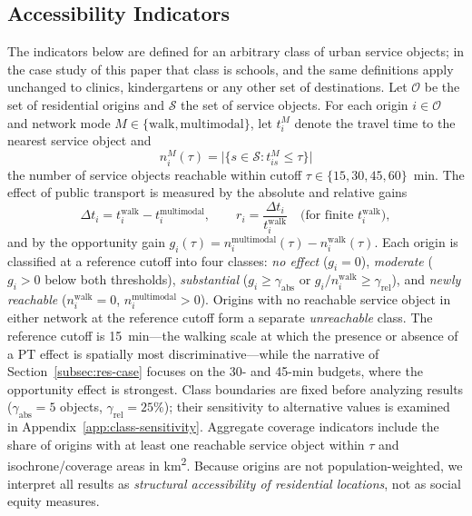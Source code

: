\documentclass[smartcities,article,submit,moreauthors]{Definitions/mdpi}
\begin{document}
    \subsection{Accessibility Indicators}
    \label{subsec:indicators}

    The indicators below are defined for an arbitrary class of urban service objects; in the case study
    of this paper that class is schools, and the same definitions apply unchanged to clinics,
    kindergartens or any other set of destinations.
    Let $\mathcal{O}$ be the set of residential origins and $\mathcal{S}$ the set of service objects.
    For each origin $i \in \mathcal{O}$ and network mode
    $M \in \{\mathrm{walk}, \mathrm{multimodal}\}$, let $t_i^{M}$ denote the travel time to the nearest
    service object and
    \begin{equation}
        n_i^{M}(\tau) = \bigl|\{ s \in \mathcal{S} : t_{is}^{M} \le \tau \}\bigr|
    \end{equation}
    the number of service objects reachable within cutoff $\tau \in \{15, 30, 45, 60\}$~min.
    The effect of public transport is measured by the absolute and relative gains
    \begin{equation}
        \Delta t_i = t_i^{\mathrm{walk}} - t_i^{\mathrm{multimodal}},
        \qquad
        r_i = \frac{\Delta t_i}{t_i^{\mathrm{walk}}} \quad \text{(for finite } t_i^{\mathrm{walk}}\text{)},
    \end{equation}
    and by the opportunity gain
    $g_i(\tau) = n_i^{\mathrm{multimodal}}(\tau) - n_i^{\mathrm{walk}}(\tau)$.
    Each origin is classified at a reference cutoff into four classes: \emph{no effect} ($g_i = 0$),
    \emph{moderate} ($g_i > 0$ below both thresholds), \emph{substantial}
    ($g_i \ge \gamma_{\mathrm{abs}}$ or $g_i / n_i^{\mathrm{walk}} \ge \gamma_{\mathrm{rel}}$), and
    \emph{newly reachable} ($n_i^{\mathrm{walk}} = 0$, $n_i^{\mathrm{multimodal}} > 0$).
    Origins with no reachable service object in either network at the reference cutoff form a separate
    \emph{unreachable} class.
    The reference cutoff is 15~min---the walking scale at which the presence or absence of a PT effect
    is spatially most discriminative---while the narrative of Section~\ref{subsec:res-case} focuses on
    the 30- and 45-min budgets, where the opportunity effect is strongest.
    Class boundaries are fixed before analyzing results ($\gamma_{\mathrm{abs}} = 5$ objects,
    $\gamma_{\mathrm{rel}} = 25\%$); their sensitivity to alternative values is examined in
    Appendix~\ref{app:class-sensitivity}.
    Aggregate coverage indicators include the share of origins with at least one reachable service
    object within $\tau$ and isochrone/coverage areas in km\textsuperscript{2}.
    Because origins are not population-weighted, we interpret all results as \emph{structural
    accessibility of residential locations}, not as social equity measures.
\end{document}
